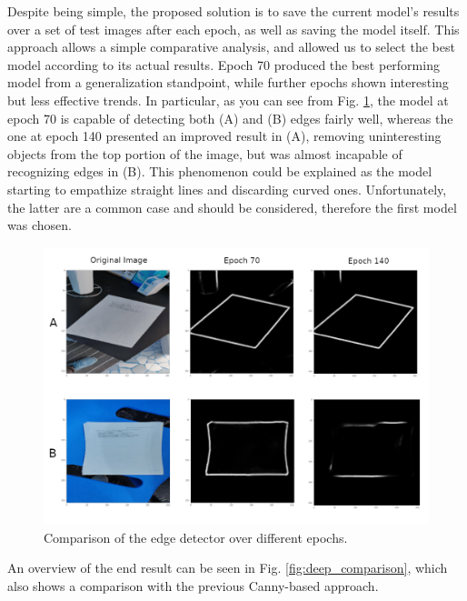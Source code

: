 \documentclass[a4paper]{article}
\begin{document}
Despite being simple, the proposed solution is to save the current model's results over a set of test images after each epoch, as well as saving the model itself. This approach allows a simple comparative analysis, and allowed us to select the best model according to its actual results. Epoch 70 produced the best performing model from a generalization standpoint, while further epochs shown interesting but less effective trends. In particular, as you can see from Fig. \ref{fig:edge_comparison_epoch}, the model at epoch 70 is capable of detecting both (A) and (B) edges fairly well, whereas the one at epoch 140 presented an improved result in (A), removing uninteresting objects from the top portion of the image, but was almost incapable of recognizing edges in (B). This phenomenon could be explained as the model starting to empathize straight lines and discarding curved ones. Unfortunately, the latter are a common case and should be considered, therefore the first model was chosen.

\begin{figure}[!htbp]
	\centering
	\includegraphics[width=\linewidth]{edge_comparison_epoch.png}
	\caption{Comparison of the edge detector over different epochs.}
	\label{fig:edge_comparison_epoch}
\end{figure}


An overview of the end result can be seen in Fig. \ref{fig:deep_comparison}, which also shows a comparison with the previous Canny-based approach.
\end{document}
